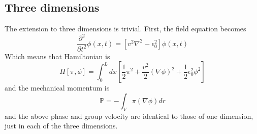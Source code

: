 \documentclass{article}
\begin{document}
\subsection{Three dimensions}
The extension to three dimensions is trivial. First, the field equation becomes
\begin{equation}
    \frac{\partial^2}{\partial t^2}\phi(x,t) = \left[v^2\nabla^2 - \epsilon_0^2\right]\phi(x,t)
\end{equation}
Which means that Hamiltonian is
\begin{equation}
    H[\pi, \phi] = \int_0^L dx \left[\frac{1}{2}\pi^2 + \frac{v^2}{2}\left(\nabla \phi\right)^2 + \frac{1}{2}\epsilon_0^2\phi^2\right]
\end{equation}
and the mechanical momentum is
\begin{equation}
    \mathbb{P} = -\int_V \pi(\nabla\phi) dr
\end{equation}
and the above phase and group velocity are identical to those of one dimension, just in each of the three dimensions.
\end{document}
